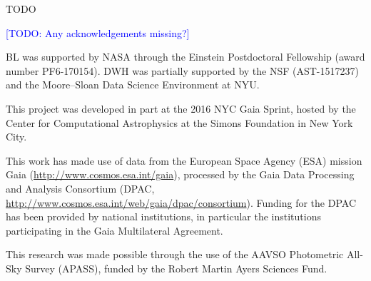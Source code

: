 \documentclass[manuscript, letterpaper]{aastex6}
\newcommand{\todo}[1]{\textcolor{blue}{[TODO: #1]}}
\begin{document}
TODO



\acknowledgments

\todo{Any acknowledgements missing?}

BL was supported by NASA through the Einstein Postdoctoral Fellowship (award number PF6-170154).
DWH was partially supported by the NSF (AST-1517237) and the Moore--Sloan Data Science Environment at NYU.

This project was developed in part at the 2016 NYC Gaia Sprint, hosted by the Center for Computational Astrophysics at the Simons Foundation in New York City.

This work has made use of data from the European Space Agency (ESA) mission Gaia (\url{http://www.cosmos.esa.int/gaia}), processed by the Gaia Data Processing and Analysis Consortium (DPAC, \url{http://www.cosmos.esa.int/web/gaia/dpac/consortium}). Funding for the DPAC has been provided by national institutions, in particular the institutions participating in the Gaia Multilateral Agreement.

This research was made possible through the use of the AAVSO Photometric All-Sky Survey (APASS), funded by the Robert Martin Ayers Sciences Fund.







\end{document}
